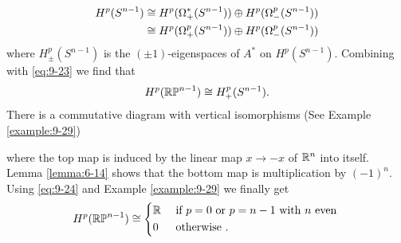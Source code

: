 \begin{example}
\begin{align*}
    H^p(S^{n-1}) 
    & \cong H^p(\Omega^*_+(S^{n-1}))\oplus H^p(\Omega^p_-(S^{n-1})) \\
    & \cong H^p(\Omega^p_+(S^{n-1}))\oplus H^p(\Omega^p_-(S^{n-1}))
  \end{align*}
  where $H^p_\pm (S^{n-1})$ is the $(\pm 1)$-eigenspaces of $A^*$ on $H^p(S^{n-1})$. Combining 
  with \eqref{eq:9-23} we find that 
  \begin{align}\label{eq:9-24}
    H^p(\mathbb{RP}^{n-1}) \cong H^p_+(S^{n-1}).
  \end{align}
  There is a commutative diagram with vertical isomorphisms (See Example \ref{example:9-29})
  \begin{center}
  \end{center}
  where the top map is induced by the linear map $x\to -x$ of ${\mathbb{R}}^n$ into itself.
  Lemma \ref{lemma:6-14} shows that the bottom map is multiplication by $(-1)^n$. 
  Using \eqref{eq:9-24} and Example \ref{example:9-29} we finally get
  \begin{align}
    H^p(\mathbb{RP}^{n-1})\cong \left\{\begin{aligned}
      & {\mathbb{R}} && \text{ if } p=0 \text{ or } p=n-1\text{ with $n$ even } \\
      & 0 && \text{ otherwise }.
    \end{aligned}\right.
  \end{align}
\end{example}